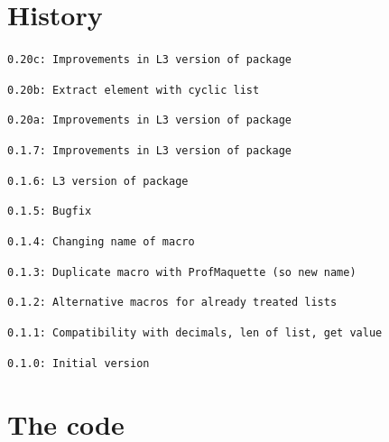 \documentclass[11pt,a4paper]{ltxdoc}
\begin{document}
\pagebreak

\section{History}

\texttt{0.20c: Improvements in L3 version of package}

\texttt{0.20b: Extract element with cyclic list}

\texttt{0.20a: Improvements in L3 version of package}

\texttt{0.1.7: Improvements in L3 version of package}

\texttt{0.1.6: L3 version of package}

\texttt{0.1.5: Bugfix}

\texttt{0.1.4: Changing name of macro}

\texttt{0.1.3: Duplicate macro with ProfMaquette (so new name)}

\texttt{0.1.2: Alternative macros for already treated lists}

\texttt{0.1.1: Compatibility with decimals, len of list, get value}

\texttt{0.1.0: Initial version}

\section{The code}

\end{document}
